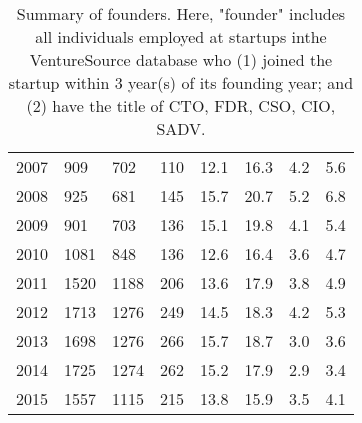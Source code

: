 \begin{table}[!htb]
\begin{tabular}{p{1.75cm}p{1.75cm}p{1.75cm}p{1.75cm}p{1.75cm}p{1.75cm}p{1.75cm}p{1.75cm}}
  2007 & 909 & 702 & 110 & 12.1 & 16.3 & 4.2 & 5.6 \\ 
  2008 & 925 & 681 & 145 & 15.7 & 20.7 & 5.2 & 6.8 \\ 
  2009 & 901 & 703 & 136 & 15.1 & 19.8 & 4.1 & 5.4 \\ 
  2010 & 1081 & 848 & 136 & 12.6 & 16.4 & 3.6 & 4.7 \\ 
  2011 & 1520 & 1188 & 206 & 13.6 & 17.9 & 3.8 & 4.9 \\ 
  2012 & 1713 & 1276 & 249 & 14.5 & 18.3 & 4.2 & 5.3 \\ 
  2013 & 1698 & 1276 & 266 & 15.7 & 18.7 & 3.0 & 3.6 \\ 
  2014 & 1725 & 1274 & 262 & 15.2 & 17.9 & 2.9 & 3.4 \\ 
  2015 & 1557 & 1115 & 215 & 13.8 & 15.9 & 3.5 & 4.1 \\ 
   \bottomrule
\end{tabular}
\endgroup
\caption{Summary of founders. Here, "founder" includes all individuals employed at startups inthe VentureSource database who (1) joined the startup within 3 year(s) of its founding year; and (2) have the title of CTO, FDR, CSO, CIO, SADV.} 
\label{table:GStable_technical}
\end{table}
